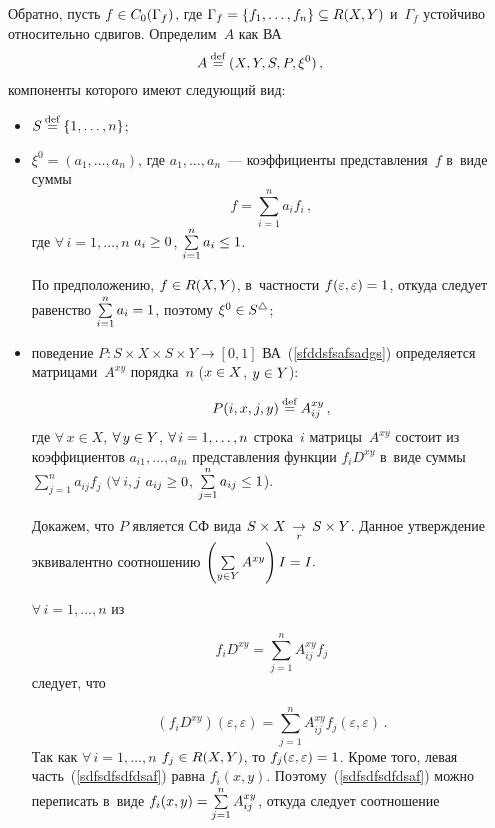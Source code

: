 \begin{multicols}{2}
Обратно, пусть $f\hm\in C_0(\Gamma_f)$, где $\Gamma_f
\hm=\{f_1,\ldots, f_n\}\hm\subseteq R(X,Y)$
и~$\Gamma_f$ устойчиво относительно сдвигов.
Определим~$A$ как ВА
\begin{equation}
\label{sfddsfsafsadgs}
A\mathbin{{\mathop{=}\limits^{\mathrm{def}}}} (X,Y,S,P, \xi^0)\,,
\end{equation}
компоненты которого имеют следующий вид:
\begin{itemize}
\item $S\mathbin{{\mathop{=}\limits^{\mathrm{def}}}} \{1,\ldots, n\}$;
\item $\xi^0=(a_1,\ldots, a_n)$,
где $a_1,\ldots, a_n$~--- коэффициенты представления~$f$ в~виде суммы
\begin{equation}
\label{sadfsadfasdfdsa34344367}
f = \sum\limits_{i=1}^na_if_i\,,
\end{equation}
где 
$\forall\,i=1,\ldots, n$ $a_i\hm\geq 0$,
$\sum\limits_{i=1}^na_i\hm\leq 1$.

\columnbreak

По предположению, $f\hm\in R(X,Y)$, в~частности
 $f(\varepsilon, \varepsilon)\hm=1$,
откуда следует равенство $\sum\limits_{i=1}^na_i\hm=1$,
поэтому $\xi^0\hm\in S^\bullettri$;
\item поведение $P:S\times X\times S\times Y\to[0,1]$
ВА~(\ref{sfddsfsafsadgs})
определяется матрицами~$A^{xy}$ порядка~$n$ ($x\hm\in X$, $y\hm\in Y$):

\noindent
$$
P(i,x,j,y)\mathbin{{\mathop{=}\limits^{\mathrm{def}}}} A^{xy}_{ij}\,,
$$
где $\forall\,x\in X$, $\forall\,y\hm\in Y$, $\forall\,i\hm=1,\ldots, n$
строка~$i$ матрицы~$A^{xy}$  состоит из коэффициентов
$a_{i1},\ldots, a_{in}$
представления функции $f_iD^{xy}$ в~виде суммы
$\sum\limits_{j=1}^na_{ij}f_j$
$(\forall\,i,j$ $a_{ij}\hm\geq 0$,
$\sum\limits_{j=1}^na_{ij} \hm\leq 1$).

Докажем, что $P$ является СФ вида $S\times X\vo S\hm\times Y$.
Данное утверждение эквивалентно соотношению
$\left(\sum\limits_{y\in Y}A^{xy}\right)I\hm=I.$

$\forall\,i=1,\ldots, n$ из

\noindent
\begin{equation}
\label{sdfsdgsfdg55566}
f_iD^{xy}=\sum\limits_{j=1}^nA^{xy}_{ij}f_j
\end{equation}
следует, что

\noindent
\begin{equation}
\label{sdfsdfsdfdsaf}
\left(f_iD^{xy}\right)(\varepsilon, \varepsilon)=
\sum\limits_{j=1}^nA^{xy}_{ij}f_j(\varepsilon, \varepsilon)\,.
\end{equation}
Так как $\forall\,i=1,\ldots, n$  $f_j\hm\in R(X,Y)$, то
$f_j(\varepsilon, \varepsilon)\hm=1$. Кроме того, левая часть~(\ref{sdfsdfsdfdsaf})
равна $f_i(x,y)$. Поэтому~(\ref{sdfsdfsdfdsaf})
можно переписать  в~виде
$f_i(x,y)\hm= \sum\limits_{j=1}^nA^{xy}_{ij}$, откуда следует
соотношение


\end{itemize}
\end{multicols}
